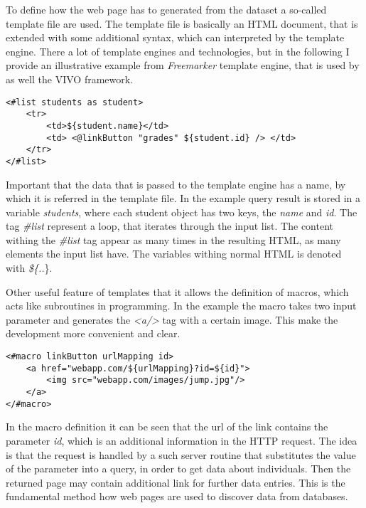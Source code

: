 To define how the web page has to generated from the dataset a so-called template file are used. The template file is basically an HTML document, that is extended with some additional syntax, which can interpreted by the template engine. There a lot of template engines and technologies, but in the following I provide an illustrative example from \textit{Freemarker} template engine, that is used by as well the VIVO framework.

\begin{lstlisting}[captionpos=b, caption=Template file example, label=skullJSON, belowskip=1em, aboveskip=2em,
basicstyle=\footnotesize,frame=single]
<#list students as student>
	<tr>
		<td>${student.name}</td>
		<td> <@linkButton "grades" ${student.id} /> </td>
	</tr>
</#list>
\end{lstlisting}

Important that the data that is passed to the template engine has a name, by which it is referred in the template file. In the example query result is stored in a variable \textit{students}, where each student object has two keys, the \textit{name} and \textit{id}. The tag \textit{\#list} represent a loop, that iterates through the input list. The content withing the \textit{\#list} tag appear as many times in the resulting HTML, as many elements the input list have. The variables withing normal HTML is denoted with \textit{\$\{..}\}. 

Other useful feature of templates that it allows the definition of macros, which acts like subroutines in programming. In the example the macro \textit{\@linkButton} takes two input parameter and generates the \textit{<a/>} tag with a certain image. This make the development more convenient and clear.

\begin{lstlisting}[captionpos=b, caption=Macro definition, label=skullJSON, belowskip=1em, aboveskip=2em,
basicstyle=\footnotesize,frame=single]
<#macro linkButton urlMapping id>
	<a href="webapp.com/${urlMapping}?id=${id}">
		<img src="webapp.com/images/jump.jpg"/>
	</a>
</#macro>
\end{lstlisting}


In the macro definition it can be seen that the url of the link contains the parameter \textit{id}, which is an additional information in the HTTP request. The idea is that the request is handled by a such server routine that substitutes the value of the parameter into a query, in order to get data about individuals. Then the returned page may contain additional link for further data entries. This is the fundamental method how web pages are used to discover data from databases.



